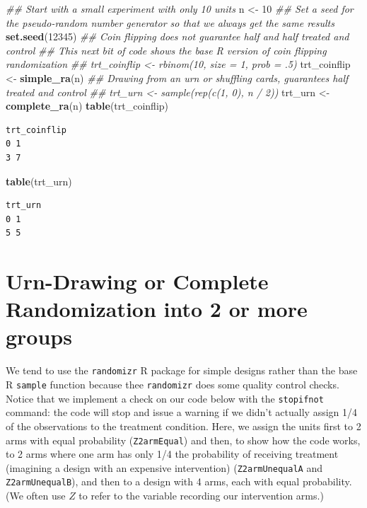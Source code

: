 \documentclass[
  12pt,
]{book}
\newenvironment{Shaded}{\begin{snugshade}}{\end{snugshade}}
\newcommand{\CommentTok}[1]{\textcolor[rgb]{0.56,0.35,0.01}{\textit{#1}}}
\newcommand{\DecValTok}[1]{\textcolor[rgb]{0.00,0.00,0.81}{#1}}
\newcommand{\KeywordTok}[1]{\textcolor[rgb]{0.13,0.29,0.53}{\textbf{#1}}}
\newcommand{\NormalTok}[1]{#1}
\newcommand{\StringTok}[1]{\textcolor[rgb]{0.31,0.60,0.02}{#1}}
\theoremstyle{definition}
\theoremstyle{definition}
\theoremstyle{definition}
\theoremstyle{remark}
\begin{document}
\begin{Shaded}
\begin{Highlighting}[]
\CommentTok{## Start with a small experiment with only 10 units}
\NormalTok{n <-}\StringTok{ }\DecValTok{10}
\CommentTok{## Set a seed for the pseudo-random number generator so that we always get the same results}
\KeywordTok{set.seed}\NormalTok{(}\DecValTok{12345}\NormalTok{)}
\CommentTok{## Coin flipping does not guarantee half and half treated and control}
\CommentTok{## This next bit of code shows the base R version of coin flipping randomization}
\CommentTok{## trt_coinflip <- rbinom(10, size = 1, prob = .5)}
\NormalTok{trt_coinflip <-}\StringTok{ }\KeywordTok{simple_ra}\NormalTok{(n)}
\CommentTok{## Drawing from an urn or shuffling cards, guarantees half treated and control}
\CommentTok{## trt_urn <- sample(rep(c(1, 0), n / 2))}
\NormalTok{trt_urn <-}\StringTok{ }\KeywordTok{complete_ra}\NormalTok{(n)}
\KeywordTok{table}\NormalTok{(trt_coinflip)}
\end{Highlighting}
\end{Shaded}

\begin{verbatim}
trt_coinflip
0 1 
3 7 
\end{verbatim}

\begin{Shaded}
\begin{Highlighting}[]
\KeywordTok{table}\NormalTok{(trt_urn)}
\end{Highlighting}
\end{Shaded}

\begin{verbatim}
trt_urn
0 1 
5 5 
\end{verbatim}

\hypertarget{urn-drawing-or-complete-randomization-into-2-or-more-groups}{%
\section{Urn-Drawing or Complete Randomization into 2 or more
groups}\label{urn-drawing-or-complete-randomization-into-2-or-more-groups}}

We tend to use the \texttt{randomizr} R package \citep{R-randomizr} for
simple designs rather than the base R \texttt{sample} function because
thee \texttt{randomizr} does some quality control checks. Notice that we
implement a check on our code below with the \texttt{stopifnot} command:
the code will stop and issue a warning if we didn't actually assign 1/4
of the observations to the treatment condition. Here, we assign the
units first to 2 arms with equal probability (\texttt{Z2armEqual}) and
then, to show how the code works, to 2 arms where one arm has only 1/4
the probability of receiving treatment (imagining a design with an
expensive intervention) (\texttt{Z2armUnequalA} and
\texttt{Z2armUnequalB}), and then to a design with 4 arms, each with
equal probability. (We often use \(Z\) to refer to the variable
recording our intervention arms.)
\end{document}
